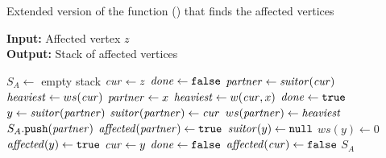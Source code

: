 \begin{algorithm}[t]
\footnotesize
\caption{\footnotesize
Extended version of the \findsuitor function () that finds the affected
vertices}
\label{algo:dyn-suitor-find-aff}
\textbf{Input:} Affected vertex $z$\\
\textbf{Output:} Stack of affected vertices

\begin{algorithmic}[1]
\State$S_A \gets$ empty stack
\State$\mathit{cur} \gets z$
\State$\mathit{done} \gets \texttt{false}$
\Repeat
\State$\mathit{partner} \gets \mathit{suitor}(\mathit{cur})$
\State$\mathit{heaviest} \gets ws(\mathit{cur})$
\label{line:dyn-find-affected:for-neighbors}
\label{line:dyn-find-suitor:first-if}
\State$\mathit{partner} \gets x$
\State$\mathit{heaviest} \gets w(\mathit{cur}, x)$
\EndIf
\EndFor
\State$\mathit{done} \gets \texttt{true}$
\label{line:dyn-find-affected:if-heaviest}
\State$y \gets \mathit{suitor}(\mathit{partner})$
\State$\mathit{suitor}(\mathit{partner}) \gets \mathit{cur}$\label{line:dyn-find-suitor:update-1}
\State$ws(\mathit{partner}) \gets \mathit{heaviest}$\label{line:dyn-find-suitor:update-2}
\State$S_A.\texttt{push}(\mathit{partner})$\label{line:dyn-find-suitor:sa-push}
\State$\mathit{affected}(\mathit{partner}) \gets \texttt{true}$
\label{line:dyn-find-affected:if-y}
\State$\mathit{suitor}(y) \gets \texttt{null}$\label{line:dyn-find-suitor:inv-1}
\State$ws(y) \gets 0$\label{line:dyn-find-suitor:inv-2}
\State$\mathit{affected}(y) \gets \texttt{true}$
\State$\mathit{cur} \gets y$
\State$\mathit{done} \gets \texttt{false}$
\EndIf
\Else
\State$\mathit{affected}(\mathit{cur}) \gets \texttt{false}$\label{line:dyn-find-affected:mark-unaffected}
\EndIf
{}
\State\Return$S_A$
\EndFunction
\end{algorithmic}
\end{algorithm}
